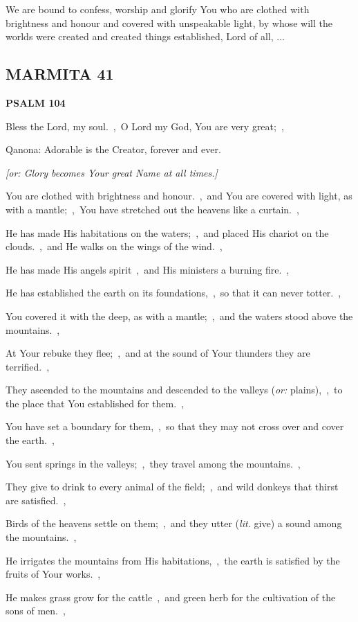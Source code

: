 \documentclass[12pt,twoside,a5paper]{article}
\newcommand{\marmita}[1]{\subsection*{MARMITA {#1}}}
\newcommand{\psalm}[1]{\textbf{PSALM {#1}}\nopagebreak}
\newcommand{\slota}[1]{\liturgicalhint{Slota.} #1}
\newcommand{\translationoption}[1]{\emph{or:} #1}
\newcommand{\translationliteral}[1]{\emph{lit.} #1}
\begin{document}
\slota{We are bound to confess, worship and glorify You who are clothed with brightness and honour and covered with unspeakable light, by whose will the worlds were created and created things established, Lord of all, ...}

\marmita{41}

\psalm{104}

\begin{normalparskip}
  Bless the Lord, my soul.~\sep\ O Lord my God, You are very great;~\sep

  Qanona: Adorable is the Creator, forever and ever.

  \emph{[or: Glory becomes Your great Name at all times.]}

  You are clothed with brightness and honour.~\sep\ and You are covered with light, as with a mantle;~\sep\ You have stretched out the heavens like a curtain.~\sep

  He has made His habitations on the waters;~\sep\ and placed His chariot on the clouds.~\sep\ and He walks on the wings of the wind.~\sep

  He has made His angels spirit~\sep\ and His ministers a burning fire.~\sep

  He has established the earth on its foundations,~\sep\ so that it can never totter.~\sep

  You covered it with the deep, as with a mantle;~\sep\ and the waters stood above the mountains.~\sep

  At Your rebuke they flee;~\sep\ and at the sound of Your thunders they are terrified.~\sep

  They ascended to the mountains and descended to the valleys (\translationoption{plains}),~\sep\ to the place that You established for them.~\sep

  You have set a boundary for them,~\sep\ so that they may not cross over and cover the earth.~\sep

  You sent springs in the valleys;~\sep\ they travel among the mountains.~\sep

  They give to drink to every animal of the field;~\sep\ and wild donkeys that thirst are satisfied.~\sep

  Birds of the heavens settle on them;~\sep\ and they utter (\translationliteral{give}) a sound among the mountains.~\sep

  He irrigates the mountains from His habitations,~\sep\ the earth is satisfied by the fruits of Your works.~\sep

  He makes grass grow for the cattle~\sep\ and green herb for the cultivation of the sons of men.~\sep


\end{normalparskip}
\end{document}

